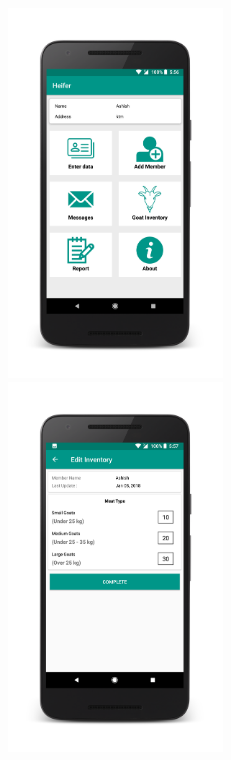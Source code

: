 \documentclass[aspectratio=169]{beamer}
\begin{document}
\begin{frame}

\begin{figure}[!h] 
    \vspace{-.5cm}
    \hspace{-3cm}
  \label{fig:app}
  \begin{minipage}{.2\textwidth}
    \includegraphics[width=5.7cm]{vcc1.png}
  \end{minipage}
  \hspace{1cm}
  \begin{minipage}{.2\textwidth}
    \includegraphics[width=5.7cm]{vcc2.png}
  \end{minipage}
  \hspace{1cm}
  \begin{minipage}{.2\textwidth}

\end{minipage}
\end{figure}
\end{frame}
\end{document}
